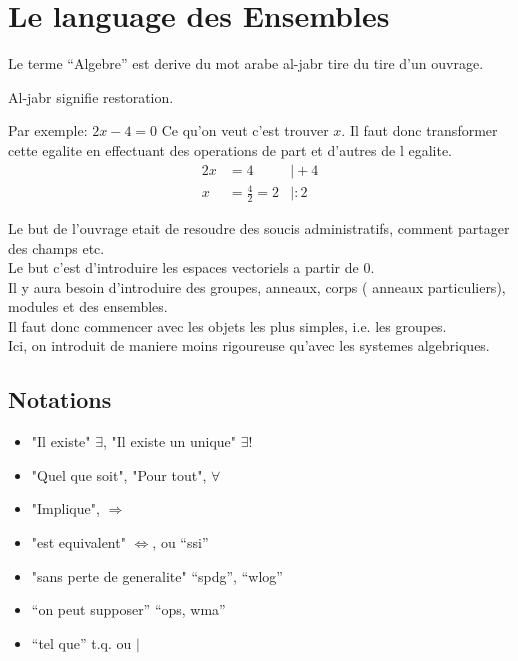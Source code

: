 \documentclass[../main.tex]{subfiles}
\begin{document}
\section{Le language des Ensembles}

Le terme ``Algebre'' est derive du mot arabe al-jabr tire du tire d'un ouvrage.

Al-jabr signifie restoration.

Par exemple:
$2x -4 = 0$
Ce qu'on veut c'est trouver $x$.
Il faut donc transformer cette egalite en effectuant des operations de part et d'autres de l egalite.
\begin{align*}
	2x &= 4 &\vert +4\\
	x &= \frac{4}{2} = 2  &\vert :2
\end{align*}



Le but de l'ouvrage etait de resoudre des soucis administratifs, comment partager des champs etc.\\

Le but c'est d'introduire les espaces vectoriels a partir de 0.\\

Il y aura besoin d'introduire des groupes, anneaux, corps ( anneaux particuliers), modules et des ensembles.\\

Il faut donc commencer avec les objets les plus simples, i.e. les groupes.\\
Ici, on introduit de maniere moins rigoureuse qu'avec les systemes algebriques.

\subsection{Notations}

\begin{itemize}
	\item "Il existe" $\exists$, "Il existe un unique"  $\exists !$\\
	\item "Quel que soit", "Pour tout",  $\forall$\\
	\item "Implique",  $\Rightarrow$ \\
	\item "est equivalent" $\iff$, ou ``ssi''\\
	\item "sans perte de generalite" ``spdg'', ``wlog''\\
	\item ``on peut supposer'' ``ops, wma''\\
	\item ``tel que'' t.q. ou $\vert$
\end{itemize}
\end{document}

